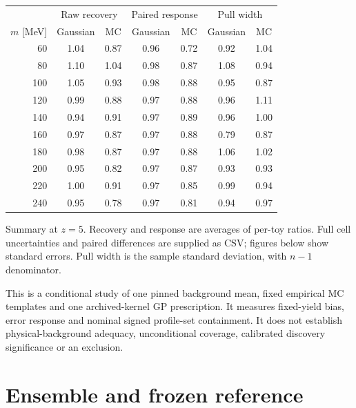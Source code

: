 \documentclass[10pt]{article}
\begin{document}
\begin{center}\small\begin{tabular}{rcccccc}\toprule
& \multicolumn{2}{c}{Raw recovery} & \multicolumn{2}{c}{Paired response} & \multicolumn{2}{c}{Pull width}\\
$m$ [MeV] & Gaussian & MC & Gaussian & MC & Gaussian & MC\\\midrule

60 & 1.04 & 0.87 & 0.96 & 0.72 & 0.92 & 1.04\\

80 & 1.10 & 1.04 & 0.98 & 0.87 & 1.08 & 0.94\\

100 & 1.05 & 0.93 & 0.98 & 0.88 & 0.95 & 0.87\\

120 & 0.99 & 0.88 & 0.97 & 0.88 & 0.96 & 1.11\\

140 & 0.94 & 0.91 & 0.97 & 0.89 & 0.96 & 1.00\\

160 & 0.97 & 0.87 & 0.97 & 0.88 & 0.79 & 0.87\\

180 & 0.98 & 0.87 & 0.97 & 0.88 & 1.06 & 1.02\\

200 & 0.95 & 0.82 & 0.97 & 0.87 & 0.93 & 0.93\\

220 & 1.00 & 0.91 & 0.97 & 0.85 & 0.99 & 0.94\\

240 & 0.95 & 0.78 & 0.97 & 0.81 & 0.94 & 0.97\\

\bottomrule\end{tabular}\end{center}
{\small Summary at $z=5$. Recovery and response are averages of per-toy ratios. Full cell uncertainties and paired differences are supplied as CSV; figures below show standard errors. Pull width is the sample standard deviation, with $n-1$ denominator.\par}
This is a conditional study of one pinned background mean, fixed empirical MC templates and one archived-kernel GP prescription. It measures fixed-yield bias, error response and nominal signed profile-set containment. It does not establish physical-background adequacy, unconditional coverage, calibrated discovery significance or an exclusion.
\clearpage\section*{Ensemble and frozen reference}
\end{document}

